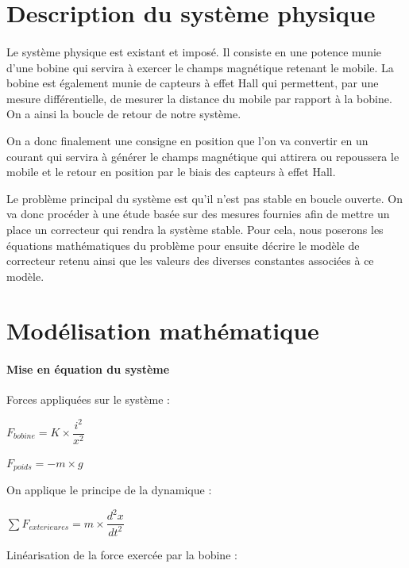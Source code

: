 \documentclass[11pt, french]{article} %
\begin{document}
\section{Description du système physique}
\paragraph{}

Le système physique est existant et imposé. Il consiste en une potence munie d'une bobine qui servira à exercer le champs magnétique retenant le mobile. La bobine est également munie de capteurs à effet Hall qui permettent, par une mesure différentielle, de mesurer la distance du mobile par rapport à la bobine. On a ainsi la boucle de retour de notre système. 

On a donc finalement une consigne en position que l'on va convertir en un courant qui servira à générer le champs magnétique qui attirera ou repoussera le mobile et le retour en position par le biais des capteurs à effet Hall. 

Le problème principal du système est qu'il n'est pas stable en boucle ouverte. On va donc procéder à une étude basée sur des mesures fournies afin de mettre un place un correcteur qui rendra la système stable. Pour cela, nous poserons les équations mathématiques du problème pour ensuite décrire le modèle de correcteur retenu ainsi que les valeurs des diverses constantes associées à ce modèle.

\section{Modélisation mathématique}

\paragraph{Mise en équation du système}

Forces appliquées sur le système :
\newline

$ F_{bobine} = K \times \dfrac{i^2}{x^2}  $

$ F_{poids} = -m \times g $

On applique le principe de la dynamique :
\newline

$ \sum F_{exterieures}  = m \times {\dfrac{{d^2}x}{dt^2}} $

Linéarisation de la force exercée par la bobine :
\newline
\end{document}
